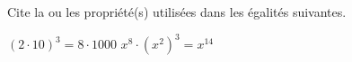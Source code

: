 %
%
Cite la ou les propriété(s) utilisées dans les égalités suivantes.
	\begin{tasks}
		\task $(2\cdot 10)^3=8\cdot 1000$
		\task $x^8\cdot (x^2)^3=x^{14}$
	\end{tasks}
